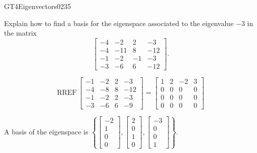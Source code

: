 \begin{exercise}{GT4}{Eigenvectors}{0235} 
\begin{exerciseStatement} 

Explain how to find a basis for the eigenspace associated to the eigenvalue \(-3\) in the matrix \[\left[\begin{array}{cccc}
-4 & -2 & 2 & -3 \\
-4 & -11 & 8 & -12 \\
-1 & -2 & -1 & -3 \\
-3 & -6 & 6 & -12
\end{array}\right].\]

 \end{exerciseStatement}
 \begin{exerciseAnswer} 

\[\mathrm{RREF}\,\left[\begin{array}{cccc}
-1 & -2 & 2 & -3 \\
-4 & -8 & 8 & -12 \\
-1 & -2 & 2 & -3 \\
-3 & -6 & 6 & -9
\end{array}\right]=\left[\begin{array}{cccc}
1 & 2 & -2 & 3 \\
0 & 0 & 0 & 0 \\
0 & 0 & 0 & 0 \\
0 & 0 & 0 & 0
\end{array}\right]\]

 

A basis of the eigenspace is \(\left\{ \left[\begin{array}{c}
-2 \\
1 \\
0 \\
0
\end{array}\right] , \left[\begin{array}{c}
2 \\
0 \\
1 \\
0
\end{array}\right] , \left[\begin{array}{c}
-3 \\
0 \\
0 \\
1
\end{array}\right] \right\}\).

 \end{exerciseAnswer}
 \end{exercise}



